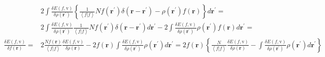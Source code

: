 \documentclass[aps,preprint]{revtex4}%
\begin{document}
\begin{align*}
&  2\int\frac{\delta E\left(  f\boldsymbol{,}\mathrm{v}\right)  }{\delta
\rho\left(  \boldsymbol{r}^{\prime}\right)  }\left\{  \frac{1}{\left\langle
f|f\right\rangle }Nf\left(  \boldsymbol{r}^{\prime}\right)  \delta\left(
\boldsymbol{r-r}^{\prime}\right)  -\rho\left(  \boldsymbol{r}^{\prime}\right)
f\left(  \boldsymbol{r}\right)  \right\}  d\boldsymbol{r}^{\prime}=\\
&  2\int\frac{\delta E\left(  f\boldsymbol{,}\mathrm{v}\right)  }{\delta
\rho\left(  \boldsymbol{r}^{\prime}\right)  }\frac{1}{\left\langle
f|f\right\rangle }Nf\left(  \boldsymbol{r}^{\prime}\right)  \delta\left(
\boldsymbol{r-r}^{\prime}\right)  d\boldsymbol{r}^{\prime}-2\int\frac{\delta
E\left(  f\boldsymbol{,}\mathrm{v}\right)  }{\delta\rho\left(  \boldsymbol{r}%
^{\prime}\right)  }\rho\left(  \boldsymbol{r}^{\prime}\right)  f\left(
\boldsymbol{r}\right)  d\boldsymbol{r}^{\prime}=\\
\frac{\delta E\left(  f\boldsymbol{,}\mathrm{v}\right)  }{\delta f\left(
\boldsymbol{r}\right)  }=  &  2\frac{Nf\left(  \boldsymbol{r}\right)
}{\left\langle f|f\right\rangle }\frac{\delta E\left(  f\boldsymbol{,}%
\mathrm{v}\right)  }{\delta\rho\left(  \boldsymbol{r}\right)  }-2f\left(
\boldsymbol{r}\right)  \int\frac{\delta E\left(  f\boldsymbol{,}%
\mathrm{v}\right)  }{\delta\rho\left(  \boldsymbol{r}^{\prime}\right)  }%
\rho\left(  \boldsymbol{r}^{\prime}\right)  d\boldsymbol{r}^{\prime}=2f\left(
\boldsymbol{r}\right)  \left\{  \frac{N}{\left\langle f|f\right\rangle }%
\frac{\delta E\left(  f\boldsymbol{,}\mathrm{v}\right)  }{\delta\rho\left(
\boldsymbol{r}\right)  }-\int\frac{\delta E\left(  f\boldsymbol{,}%
\mathrm{v}\right)  }{\delta\rho\left(  \boldsymbol{r}^{\prime}\right)  }%
\rho\left(  \boldsymbol{r}^{\prime}\right)  d\boldsymbol{r}^{\prime}\right\}
\end{align*}




\end{document}
